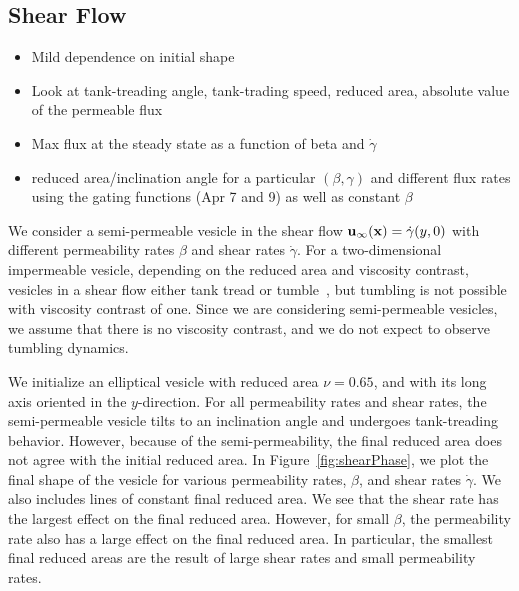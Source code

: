 \documentclass[aps,prl,showpacs]{revtex4}
\begin{document}
\subsection{Shear Flow}
\begin{itemize}
  \item Mild dependence on initial shape

  \item Look at tank-treading angle, tank-trading speed, reduced area,
    absolute value of the permeable flux

  \item Max flux at the steady state as a function of beta and
    $\dot{\gamma}$

  \item reduced area/inclination angle for a particular $(\beta,\gamma)$
    and different flux rates using the gating functions (Apr 7 and 9) as
    well as constant $\beta$
\end{itemize}

We consider a semi-permeable vesicle in the shear flow
$\mathbf{u}_{\infty}(\mathbf{x}) = \dot{\gamma} (y,0)$ with different permeability
rates $\beta$ and shear rates $\dot{\gamma}$.  For a two-dimensional
impermeable vesicle, depending on the reduced area and viscosity
contrast, vesicles in a shear flow either tank tread or
tumble~\cite{fin-lam-sei-gom2008,kra-win-sei-lip1996}, but tumbling is
not possible with viscosity contrast of one. Since we are considering
semi-permeable vesicles, we assume that there is no viscosity contrast,
and we do not expect to observe tumbling dynamics.

We initialize an elliptical vesicle with reduced area $\nu = 0.65$, and
with its long axis oriented in the $y$-direction. For all permeability
rates and shear rates, the semi-permeable vesicle tilts to an
inclination angle and undergoes tank-treading behavior. However, because
of the semi-permeability, the final reduced area does not agree with the
initial reduced area. In Figure~\ref{fig:shearPhase}, we plot the final
shape of the vesicle for various permeability rates, $\beta$, and shear
rates $\dot{\gamma}$. We also includes lines of constant final reduced
area. We see that the shear rate has the largest effect on the final
reduced area. However, for small $\beta$, the permeability rate also has
a large effect on the final reduced area. In particular, the smallest
final reduced areas are the result of large shear rates and small
permeability rates.
\end{document}
